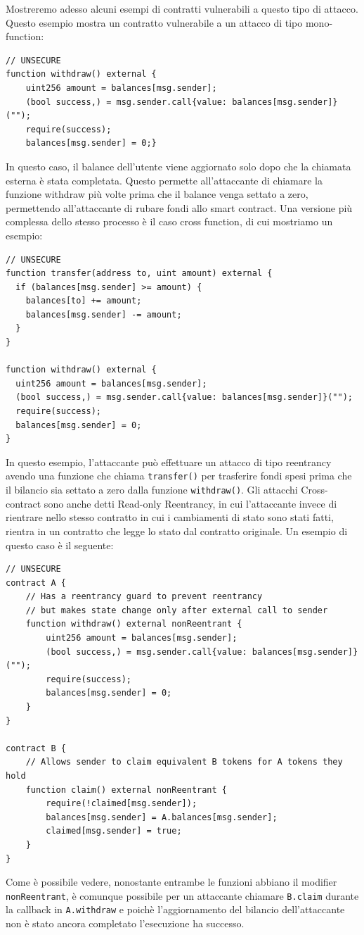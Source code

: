 \documentclass[../../Thesis.tex]{subfiles}
\begin{document}
Mostreremo adesso alcuni esempi di contratti vulnerabili a questo tipo di attacco. Questo esempio mostra un contratto vulnerabile a un attacco di tipo mono-function: 
\begin{lstlisting}[language=Solidity]
// UNSECURE
function withdraw() external {
    uint256 amount = balances[msg.sender];
    (bool success,) = msg.sender.call{value: balances[msg.sender]}("");
    require(success);
    balances[msg.sender] = 0;}
\end{lstlisting}
In questo caso, il balance dell'utente viene aggiornato solo dopo che la chiamata esterna \`e stata completata. Questo permette all'attaccante di chiamare la funzione withdraw pi\`u volte prima che il balance venga settato a zero, permettendo all'attaccante di rubare fondi allo smart contract.
Una versione pi\`u complessa dello stesso processo \`e il caso cross function, di cui mostriamo un esempio:
\begin{lstlisting}[language=Solidity]
    // UNSECURE
function transfer(address to, uint amount) external {
  if (balances[msg.sender] >= amount) {
    balances[to] += amount;
    balances[msg.sender] -= amount;
  }
}

function withdraw() external {
  uint256 amount = balances[msg.sender];
  (bool success,) = msg.sender.call{value: balances[msg.sender]}("");
  require(success);
  balances[msg.sender] = 0;
}
\end{lstlisting}
In questo esempio, l'attaccante pu\`o effettuare un attacco di tipo reentrancy avendo una funzione che chiama \texttt{transfer()} per trasferire fondi spesi prima che il bilancio sia settato a zero dalla funzione \texttt{withdraw()}.
Gli attacchi Cross-contract sono anche detti Read-only Reentrancy, in cui l'attaccante invece di rientrare nello stesso contratto in cui i cambiamenti di stato sono stati fatti, rientra in un contratto che legge lo stato dal contratto originale. Un esempio di questo caso \`e il seguente:
\begin{lstlisting}[language=Solidity]
    // UNSECURE
contract A {
	// Has a reentrancy guard to prevent reentrancy
	// but makes state change only after external call to sender
	function withdraw() external nonReentrant {
		uint256 amount = balances[msg.sender];
		(bool success,) = msg.sender.call{value: balances[msg.sender]}("");
		require(success);
		balances[msg.sender] = 0;
	}
}

contract B {
	// Allows sender to claim equivalent B tokens for A tokens they hold
	function claim() external nonReentrant {
		require(!claimed[msg.sender]);
		balances[msg.sender] = A.balances[msg.sender];
		claimed[msg.sender] = true;
	}
}
\end{lstlisting}
Come \`e possibile vedere, nonostante entrambe le funzioni abbiano il modifier \texttt{nonReentrant}, \`e comunque possibile per un attaccante chiamare \texttt{B.claim} durante la callback in \texttt{A.withdraw} e poich\`e l'aggiornamento del bilancio dell'attaccante non \`e stato ancora completato l'esecuzione ha successo.
\end{document}
